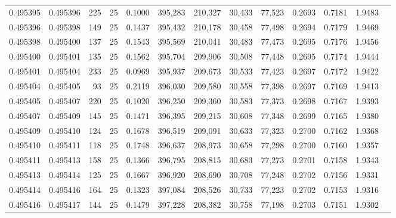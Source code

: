 \begin{tabular}{rrrrrrrrrrrrr}
0.495395 & 0.495396 &   225 &  25 &                                     0.1000 & 395,283 & 210,327 &  30,433 &  77,523 & 0.2693 & 0.7181 & 1.9483 \\
0.495396 & 0.495398 &   149 &  25 &                                     0.1437 & 395,432 & 210,178 &  30,458 &  77,498 & 0.2694 & 0.7179 & 1.9469 \\
0.495398 & 0.495400 &   137 &  25 &                                     0.1543 & 395,569 & 210,041 &  30,483 &  77,473 & 0.2695 & 0.7176 & 1.9456 \\
0.495400 & 0.495401 &   135 &  25 &                                     0.1562 & 395,704 & 209,906 &  30,508 &  77,448 & 0.2695 & 0.7174 & 1.9444 \\
0.495401 & 0.495404 &   233 &  25 &                                     0.0969 & 395,937 & 209,673 &  30,533 &  77,423 & 0.2697 & 0.7172 & 1.9422 \\
0.495404 & 0.495405 &    93 &  25 &                                     0.2119 & 396,030 & 209,580 &  30,558 &  77,398 & 0.2697 & 0.7169 & 1.9413 \\
0.495405 & 0.495407 &   220 &  25 &                                     0.1020 & 396,250 & 209,360 &  30,583 &  77,373 & 0.2698 & 0.7167 & 1.9393 \\
0.495407 & 0.495409 &   145 &  25 &                                     0.1471 & 396,395 & 209,215 &  30,608 &  77,348 & 0.2699 & 0.7165 & 1.9380 \\
0.495409 & 0.495410 &   124 &  25 &                                     0.1678 & 396,519 & 209,091 &  30,633 &  77,323 & 0.2700 & 0.7162 & 1.9368 \\
0.495410 & 0.495411 &   118 &  25 &                                     0.1748 & 396,637 & 208,973 &  30,658 &  77,298 & 0.2700 & 0.7160 & 1.9357 \\
0.495411 & 0.495413 &   158 &  25 &                                     0.1366 & 396,795 & 208,815 &  30,683 &  77,273 & 0.2701 & 0.7158 & 1.9343 \\
0.495413 & 0.495414 &   125 &  25 &                                     0.1667 & 396,920 & 208,690 &  30,708 &  77,248 & 0.2702 & 0.7156 & 1.9331 \\
0.495414 & 0.495416 &   164 &  25 &                                     0.1323 & 397,084 & 208,526 &  30,733 &  77,223 & 0.2702 & 0.7153 & 1.9316 \\
0.495416 & 0.495417 &   144 &  25 &                                     0.1479 & 397,228 & 208,382 &  30,758 &  77,198 & 0.2703 & 0.7151 & 1.9302 \\

\end{tabular}

